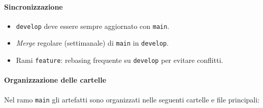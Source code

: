 \documentclass[12pt, a4paper]{article}
\begin{document}
\paragraph{Sincronizzazione}
\begin{itemize}
    \item \texttt{develop} deve essere sempre aggiornato con \texttt{main}.
    \item \textit{Merge} regolare (settimanale) di \texttt{main} in \texttt{develop}.
    \item Rami \texttt{feature}: rebasing frequente su \texttt{develop} per evitare conflitti.
\end{itemize}

\paragraph{Organizzazione delle cartelle}
Nel ramo \texttt{main} gli artefatti sono organizzati nelle seguenti cartelle e file principali:
\end{document}
